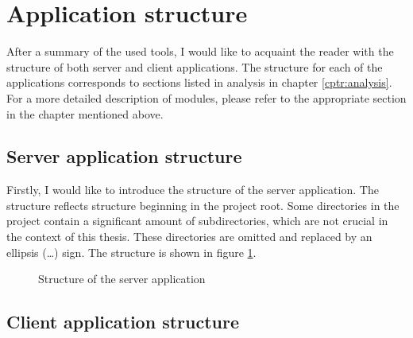 \section{Application structure}\label{sec:application-structure}

After a summary of the used tools, I would like to acquaint the reader with the structure of both server and client applications.
The structure for each of the applications corresponds to sections listed in analysis in chapter \ref{cptr:analysis}.
For a more detailed description of modules, please refer to the appropriate section in the chapter mentioned above.

\subsection{Server application structure}

Firstly, I would like to introduce the structure of the server application.
The structure reflects structure beginning in the project root.
Some directories in the project contain a significant amount of subdirectories, which are not crucial in the context of this thesis.
These directories are omitted and replaced by an ellipsis (\dots) sign.
The structure is shown in figure \ref{fig:server-structure}.

\begin{figure}[H]
    \caption{Structure of the server application}\label{fig:server-structure}
\end{figure}

\subsection{Client application structure}

